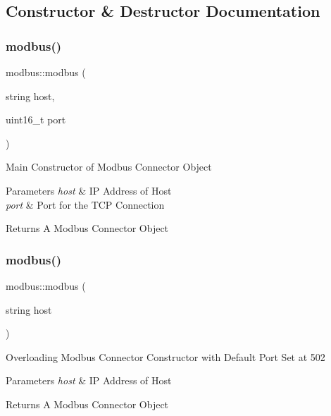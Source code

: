 \subsection{Constructor \& Destructor Documentation}
\mbox{\label{classmodbus_a8a92b53fdbacc156cd2b5f21a244b5f2}} 
\subsubsection{\texorpdfstring{modbus()}{modbus()}\hspace{0.1cm}{\footnotesize\ttfamily [1/2]}}
{\footnotesize\ttfamily modbus\+::modbus (\begin{DoxyParamCaption}\item[{string}]{host,  }\item[{uint16\+\_\+t}]{port }\end{DoxyParamCaption})}

Main Constructor of Modbus Connector Object 
\begin{DoxyParams}{Parameters}
{\em host} & IP Address of Host \\
\hline
{\em port} & Port for the T\+CP Connection \\
\hline
\end{DoxyParams}
\begin{DoxyReturn}{Returns}
A Modbus Connector Object 
\end{DoxyReturn}
\mbox{\label{classmodbus_a6902af6b4f02a3cc07ef040c389360d2}} 
\subsubsection{\texorpdfstring{modbus()}{modbus()}\hspace{0.1cm}{\footnotesize\ttfamily [2/2]}}
{\footnotesize\ttfamily modbus\+::modbus (\begin{DoxyParamCaption}\item[{string}]{host }\end{DoxyParamCaption})}

Overloading Modbus Connector Constructor with Default Port Set at 502 
\begin{DoxyParams}{Parameters}
{\em host} & IP Address of Host \\
\hline
\end{DoxyParams}
\begin{DoxyReturn}{Returns}
A Modbus Connector Object 
\end{DoxyReturn}
\mbox{\label{classmodbus_a28daaab3b7a8c838636c639d2eb14e4f}} 
